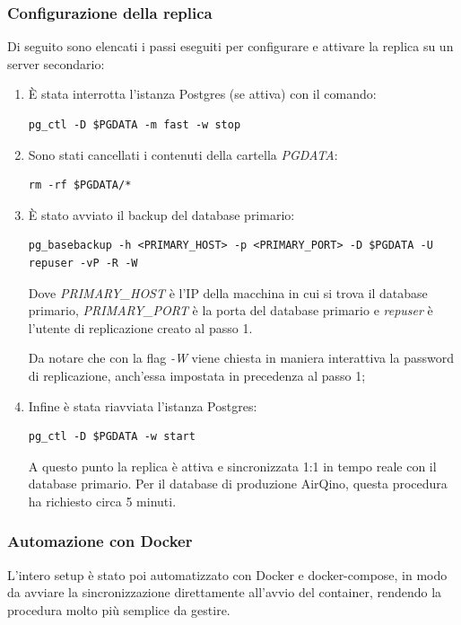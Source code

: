 \subsubsection{Configurazione della replica}\label{conf-repl}
Di seguito sono elencati i passi eseguiti per configurare e attivare la replica su un server secondario:

\begin{enumerate}
  \item È stata interrotta l'istanza Postgres (se attiva) con il comando:
  \vspace{1mm}
\begin{lstlisting}[]
pg_ctl -D $PGDATA -m fast -w stop
\end{lstlisting}
  \item Sono stati cancellati i contenuti della cartella \textit{PGDATA}:
  \vspace{1mm}
\begin{lstlisting}[]
rm -rf $PGDATA/*
\end{lstlisting}
  \item È stato avviato il backup del database primario:
  \vspace{1mm}
\begin{lstlisting}[]
pg_basebackup -h <PRIMARY_HOST> -p <PRIMARY_PORT> -D $PGDATA -U repuser -vP -R -W
\end{lstlisting}
Dove \textit{PRIMARY\_HOST} è l'IP della macchina in cui si trova il database primario, \textit{PRIMARY\_PORT} è la porta del database primario e \textit{repuser} è l'utente di replicazione creato al passo 1.

Da notare che con la flag \textit{-W} viene chiesta in maniera interattiva la password di replicazione, anch'essa impostata in precedenza al passo 1;
  \item Infine è stata riavviata l'istanza Postgres:
  \vspace{1mm}
\begin{lstlisting}[]
pg_ctl -D $PGDATA -w start
\end{lstlisting}
A questo punto la replica è attiva e sincronizzata 1:1 in tempo reale con il database primario. Per il database di produzione AirQino, questa procedura ha richiesto circa 5 minuti.
\end{enumerate}

\subsubsection{Automazione con Docker}
L'intero setup è stato poi automatizzato con Docker e docker-compose, in modo da avviare la sincronizzazione direttamente all'avvio del container, rendendo la procedura molto più semplice da gestire.

